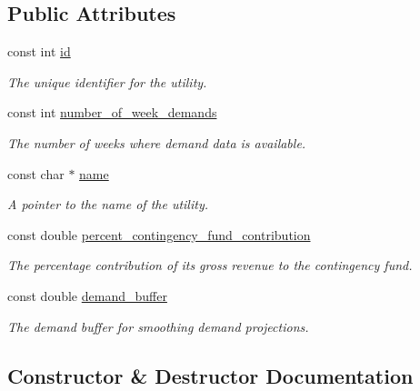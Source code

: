 \subsection*{Public Attributes}
\begin{DoxyCompactItemize}
\item 
const int \mbox{\hyperlink{classUtility_ad41c4ea5c911c5000452a3371cd65d5f}{id}}
\begin{DoxyCompactList}\small\item\em The unique identifier for the utility. \end{DoxyCompactList}\item 
const int \mbox{\hyperlink{classUtility_a0548db3746582251082aa430db49dad0}{number\+\_\+of\+\_\+week\+\_\+demands}}
\begin{DoxyCompactList}\small\item\em The number of weeks where demand data is available. \end{DoxyCompactList}\item 
const char $\ast$ \mbox{\hyperlink{classUtility_ad0ce5c179a7f5ceb46d4fcae08dbfb47}{name}}
\begin{DoxyCompactList}\small\item\em A pointer to the name of the utility. \end{DoxyCompactList}\item 
const double \mbox{\hyperlink{classUtility_a7b1a097ec188be8e7175d058b5e6596c}{percent\+\_\+contingency\+\_\+fund\+\_\+contribution}}
\begin{DoxyCompactList}\small\item\em The percentage contribution of its gross revenue to the contingency fund. \end{DoxyCompactList}\item 
const double \mbox{\hyperlink{classUtility_a4be9760339ec06e5c932890da8e566b3}{demand\+\_\+buffer}}
\begin{DoxyCompactList}\small\item\em The demand buffer for smoothing demand projections. \end{DoxyCompactList}\end{DoxyCompactItemize}


\subsection{Constructor \& Destructor Documentation}
\mbox{\label{classUtility_a53fb19e5a344de5892c5cfbcc1225da9}} 
